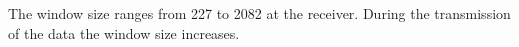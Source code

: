 The window size ranges from 227 to 2082 at the receiver. During the transmission of the data the window size increases.